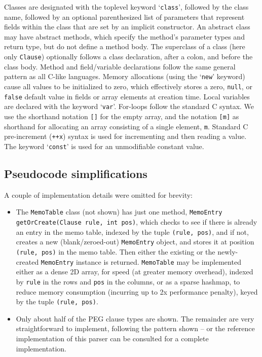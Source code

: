\documentclass[manuscript]{acmart}
\begin{document}
Classes are designated with the toplevel keyword `\texttt{class}', followed by the class name, followed by an optional parenthesized list of parameters that represent fields within the class that are set by an implicit constructor. An abstract class may have abstract methods, which specify the method's parameter types and return type, but do not define a method body. The superclass of a class (here only \texttt{Clause}) optionally follows a class declaration, after a colon, and before the class body. Method and field/variable declarations follow the same general pattern as all C-like languages. Memory allocations (using the `\texttt{new}' keyword) cause all values to be initialized to zero, which effectively stores a zero, \texttt{null}, or \texttt{false} default value in fields or array elements at creation time. Local variables are declared with the keyword `\texttt{var}'. For-loops follow the standard C syntax. We use the shorthand notation \texttt{[]} for the empty array, and the notation \texttt{[m]} as shorthand for allocating an array consisting of a single element, \texttt{m}. Standard C pre-increment (\texttt{++x}) syntax is used for incrementing and then reading a value. The keyword `\texttt{const}' is used for an unmodifiable constant value.

\subsection{Pseudocode simplifications}

A couple of implementation details were omitted for brevity:

\begin{itemize}
    \item The \texttt{MemoTable} class (not shown) has just one method, \texttt{MemoEntry getOrCreate(Clause rule, int pos)}, which checks to see if there is already an entry in the memo table, indexed by the tuple \texttt{(rule, pos)}, and if not, creates a new (blank/zeroed-out) \texttt{MemoEntry} object, and stores it at position \texttt{(rule, pos)} in the memo table. Then either the existing or the newly-created \texttt{MemoEntry} instance is returned. \texttt{MemoTable} may be implemented either as a dense 2D array, for speed (at greater memory overhead), indexed by \texttt{rule} in the rows and \texttt{pos} in the columns, or as a sparse hashmap, to reduce memory consumption (incurring up to 2x performance penalty), keyed by the tuple \texttt{(rule, pos)}.

    \item Only about half of the PEG clause types are shown. The remainder are very straightforward to implement, following the pattern shown -- or the reference implementation of this parser can be consulted for a complete implementation. %
\end{itemize}
\end{document}
